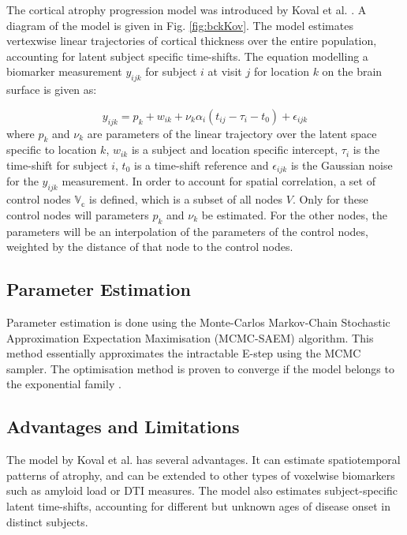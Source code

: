 The cortical atrophy progression model was introduced by Koval et al.  \cite{koval2018spatiotemporal}. A diagram of the model is given in Fig. \ref{fig:bckKov}. The model estimates vertexwise linear trajectories of cortical thickness over the entire population, accounting for latent subject specific time-shifts. The equation modelling a biomarker measurement $y_{ijk}$ for subject $i$ at visit $j$ for location $k$ on the brain surface is given as:

\begin{equation}
y_{ijk} = p_k + w_{ik} + \nu_k\alpha_i(t_{ij} - \tau_i - t_0) + \epsilon_{ijk}
\end{equation} 
where $p_k$ and $\nu_k$ are parameters of the linear trajectory over the latent space specific to location $k$, $w_{ik}$ is a subject and location specific intercept, $\tau_i$ is the time-shift for subject $i$, $t_0$ is a time-shift reference and $\epsilon_{ijk}$ is the Gaussian noise for the $y_{ijk}$ measurement. In order to account for spatial correlation, a set of control nodes $\mathbb{V_c}$ is defined, which is a subset of all nodes $V$. Only for these control nodes will parameters $p_k$ and $\nu_k$ be estimated. For the other nodes, the parameters will be an interpolation of the parameters of the control nodes, weighted by the distance of that node to the control nodes. 

\subsection{Parameter Estimation}

Parameter estimation is done using the Monte-Carlos Markov-Chain Stochastic Approximation Expectation Maximisation (MCMC-SAEM) algorithm. This method essentially approximates the intractable E-step using the MCMC sampler. The optimisation method is proven to converge if the model belongs to the exponential family \cite{koval2017statistical}.

\subsection{Advantages and Limitations}

The model by Koval et al. has several advantages. It can estimate spatiotemporal patterns of atrophy, and can be extended to other types of voxelwise biomarkers such as amyloid load or DTI measures. The model also estimates subject-specific latent time-shifts, accounting for different but unknown ages of disease onset in distinct subjects. 

